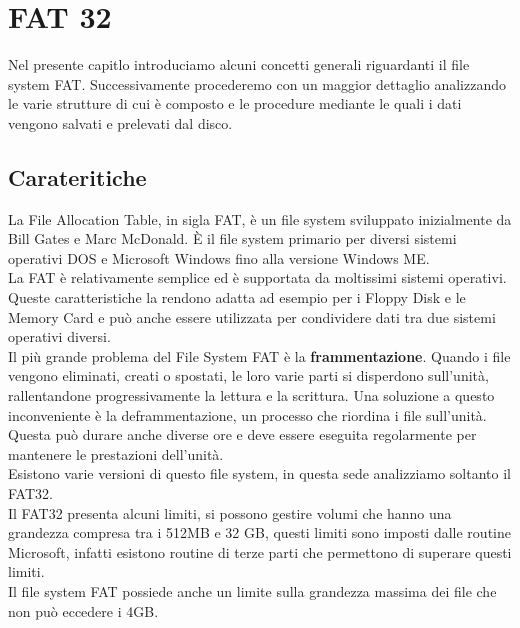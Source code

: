\chapter{FAT 32}
\label{cap:Fat}
    Nel presente capitlo introduciamo alcuni concetti generali riguardanti il file system FAT. 
    Successivamente procederemo con un maggior dettaglio analizzando le varie strutture di cui è composto e le procedure mediante le quali i dati vengono salvati e prelevati dal disco. 
  \section{Carateritiche}
  \label{sec:Carateristiche}
    La File Allocation Table, in sigla FAT, è un file system sviluppato inizialmente da Bill Gates e Marc McDonald. È il file system primario per diversi sistemi operativi DOS e Microsoft Windows fino alla versione Windows ME.\\
    La FAT è relativamente semplice ed è supportata da moltissimi sistemi operativi. Queste caratteristiche la rendono adatta ad esempio per i Floppy Disk e le Memory Card e può anche essere utilizzata per condividere dati tra due sistemi operativi diversi.\\
    Il più grande problema del File System FAT è la \textbf{frammentazione}. Quando i file vengono eliminati, creati o spostati, le loro varie parti si disperdono sull'unità, rallentandone progressivamente la lettura e la scrittura. Una soluzione a questo inconveniente è la deframmentazione, un processo che riordina i file sull'unità. Questa può durare anche diverse ore e deve essere eseguita regolarmente per mantenere le prestazioni dell'unità.\\
    Esistono varie versioni di questo file system, in questa sede analizziamo soltanto il FAT32. \\ 
    Il FAT32 presenta alcuni limiti, si possono gestire volumi che hanno una grandezza compresa tra i 512MB e 32 GB, questi limiti sono imposti dalle routine Microsoft, infatti esistono routine di terze parti che permettono di superare questi limiti. \\
    Il file system FAT possiede anche un limite sulla grandezza massima dei file che non può eccedere i 4GB. \\

